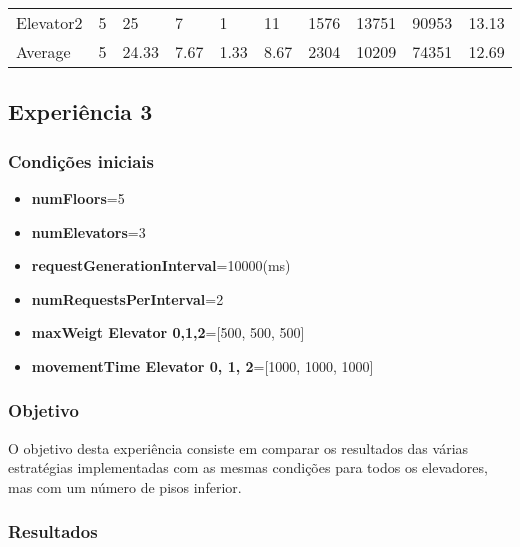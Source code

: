 \documentclass[a4paper]{article}
\begin{document}
\begin{table}[h]
\begin{tabular}{@{}llllllllll@{}}
Elevator2 & 5        & 25            & 7           & 1                                                               & 11                                                                  & 1576                                                         & 13751                                                 & 90953                                                   & 13.13         \\
Average   & 5     & 24.33         & 7.67        & 1.33                                                               & 8.67                                                               & 2304                                                         & 10209                                                 & 74351                                                   &  12.69         \\ \bottomrule
\end{tabular}
\end{table}

\subsection{Experiência 3}

\subsubsection{Condições iniciais}

\begin{itemize}
\item \textbf{numFloors}=5
\item \textbf{numElevators}=3
\item \textbf{requestGenerationInterval}=10000(ms)
\item \textbf{numRequestsPerInterval}=2
\item \textbf{maxWeigt Elevator 0,1,2}=[500, 500, 500]
\item \textbf{movementTime Elevator 0, 1, 2}=[1000, 1000, 1000]
\end{itemize}

\subsubsection{Objetivo} 

O objetivo desta experiência consiste em comparar os resultados das várias estratégias implementadas com as mesmas condições para todos os elevadores, mas com um número de pisos inferior.

\subsubsection{Resultados}
\end{document}

